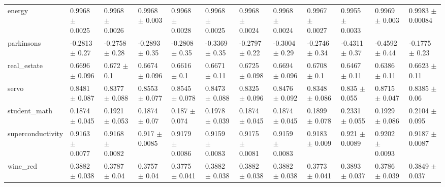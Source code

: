 \begin{tabular}{llllllllllll}
energy & 0.9968 $\pm$ 0.0025 & 0.9968 $\pm$ 0.0026 & 0.9968 $\pm$ 0.003 & 0.9968 $\pm$ 0.0028 & 0.9968 $\pm$ 0.0025 & 0.9968 $\pm$ 0.0024 & 0.9968 $\pm$ 0.0024 & 0.9967 $\pm$ 0.0027 & 0.9955 $\pm$ 0.0033 & 0.9969 $\pm$ 0.003 & 0.9983 $\pm$ 0.00084 \\
parkinsons & -0.2813 $\pm$ 0.27 & -0.2758 $\pm$ 0.28 & -0.2893 $\pm$ 0.35 & -0.2808 $\pm$ 0.35 & -0.3369 $\pm$ 0.35 & -0.2797 $\pm$ 0.22 & -0.3004 $\pm$ 0.29 & -0.2746 $\pm$ 0.34 & -0.4311 $\pm$ 0.37 & -0.4592 $\pm$ 0.44 & -0.1775 $\pm$ 0.23 \\
real\_estate & 0.6696 $\pm$ 0.096 & 0.672 $\pm$ 0.1 & 0.6674 $\pm$ 0.096 & 0.6616 $\pm$ 0.1 & 0.6671 $\pm$ 0.11 & 0.6725 $\pm$ 0.098 & 0.6694 $\pm$ 0.096 & 0.6708 $\pm$ 0.1 & 0.6467 $\pm$ 0.11 & 0.6386 $\pm$ 0.11 & 0.6623 $\pm$ 0.11 \\
servo & 0.8481 $\pm$ 0.087 & 0.8377 $\pm$ 0.088 & 0.8553 $\pm$ 0.077 & 0.8545 $\pm$ 0.078 & 0.8473 $\pm$ 0.088 & 0.8325 $\pm$ 0.096 & 0.8476 $\pm$ 0.092 & 0.8348 $\pm$ 0.086 & 0.835 $\pm$ 0.055 & 0.8715 $\pm$ 0.047 & 0.8385 $\pm$ 0.06 \\
student\_math & 0.1874 $\pm$ 0.045 & 0.1921 $\pm$ 0.053 & 0.1874 $\pm$ 0.07 & 0.187 $\pm$ 0.074 & 0.1978 $\pm$ 0.039 & 0.1874 $\pm$ 0.045 & 0.1874 $\pm$ 0.045 & 0.1899 $\pm$ 0.078 & 0.2331 $\pm$ 0.055 & 0.1929 $\pm$ 0.086 & 0.2104 $\pm$ 0.095 \\
superconductivity & 0.9163 $\pm$ 0.0077 & 0.9168 $\pm$ 0.0082 & 0.917 $\pm$ 0.0085 & 0.9179 $\pm$ 0.0086 & 0.9159 $\pm$ 0.0083 & 0.9175 $\pm$ 0.0081 & 0.9159 $\pm$ 0.0083 & 0.9183 $\pm$ 0.009 & 0.921 $\pm$ 0.0089 & 0.9202 $\pm$ 0.0093 & 0.9187 $\pm$ 0.0087 \\
wine\_red & 0.3882 $\pm$ 0.038 & 0.3787 $\pm$ 0.04 & 0.3757 $\pm$ 0.04 & 0.3775 $\pm$ 0.041 & 0.3882 $\pm$ 0.038 & 0.3882 $\pm$ 0.038 & 0.3882 $\pm$ 0.038 & 0.3773 $\pm$ 0.041 & 0.3893 $\pm$ 0.037 & 0.3786 $\pm$ 0.039 & 0.3849 $\pm$ 0.037 \\
\bottomrule
\end{tabular}
